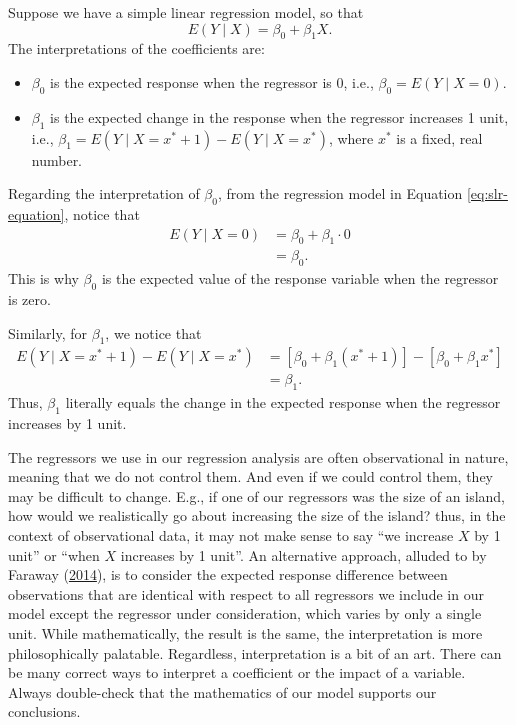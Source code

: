 \documentclass[
]{book}
\providecommand{\tightlist}{%
  \setlength{\itemsep}{0pt}\setlength{\parskip}{0pt}}
\theoremstyle{definition}
\theoremstyle{definition}
\theoremstyle{definition}
\theoremstyle{definition}
\theoremstyle{remark}
\begin{document}
Suppose we have a simple linear regression model, so that \[
E(Y\mid X)=\beta_0 + \beta_1 X. \label{eq:slr-equation}
\] The interpretations of the coefficients are:

\begin{itemize}
\tightlist
\item
  \(\beta_0\) is the expected response when the regressor is 0, i.e.,
  \(\beta_0=E(Y\mid X=0)\).
\item
  \(\beta_1\) is the expected change in the response when the regressor
  increases 1 unit, i.e., \(\beta_1=E(Y\mid X=x^*+1)-E(Y\mid X=x^*)\),
  where \(x^*\) is a fixed, real number.
\end{itemize}

Regarding the interpretation of \(\beta_0\), from the regression model in
Equation \eqref{eq:slr-equation}, notice that \[
\begin{aligned}
E(Y\mid X = 0) &= \beta_0 + \beta_1 \cdot 0 \\
&= \beta_0.
\end{aligned}
\] This is why \(\beta_0\) is the expected value of the response variable
when the regressor is zero.

Similarly, for \(\beta_1\), we notice that \[
\begin{aligned}
E(Y\mid X=x^*+1)-E(Y\mid X=x^*) &= [\beta_0 + \beta_1 (x^* + 1)] - [\beta_0 + \beta_1 x^*] \\
&= \beta_1.
\end{aligned}
\] Thus, \(\beta_1\) literally equals the change in the expected response
when the regressor increases by 1 unit.

The regressors we use in our regression analysis are often observational
in nature, meaning that we do not control them. And even if we could
control them, they may be difficult to change. E.g., if one of our
regressors was the size of an island, how would we realistically go
about increasing the size of the island? thus, in the context of
observational data, it may not make sense to say ``we increase \(X\) by 1
unit'' or ``when \(X\) increases by 1 unit''. An alternative approach,
alluded to by Faraway (\protect\hyperlink{ref-lmwr2}{2014}), is to consider the expected response difference
between observations that are identical with respect to all regressors
we include in our model except the regressor under consideration, which
varies by only a single unit. While mathematically, the result is the
same, the interpretation is more philosophically palatable. Regardless,
interpretation is a bit of an art. There can be many correct ways to
interpret a coefficient or the impact of a variable. Always double-check
that the mathematics of our model supports our conclusions.
\end{document}
